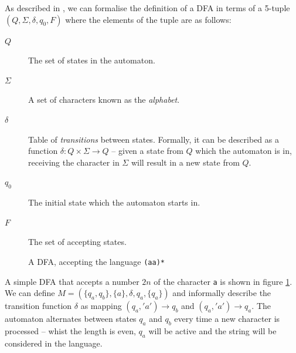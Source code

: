 \documentclass[a4paper,openany]{book}
\begin{document}
As described in \citet[p.~35]{sipser2012introduction}, we can formalise the definition of a DFA in terms of a 5-tuple $(Q, \Sigma, \delta, q_0, F)$ where the elements of the tuple are as follows:

\begin{description}
	\item[$Q$] The set of states in the automaton.
	\item[$\Sigma$] A set of characters known as the \emph{alphabet}.
	\item[$\delta$] Table of \emph{transitions} between states. Formally, it can be described as a function $\delta : Q \times \Sigma \rightarrow Q$ -- given a state from $Q$ which the automaton is in, receiving the character in $\Sigma$ will result in a new state from $Q$.
	\item[$q_0$] The initial state which the automaton starts in.
	\item[$F$] The set of accepting states.
\end{description}
	
\begin{figure}[H]
\begin{MyMdframed}
\vspace{0.5em}


\caption{\label{figure:dfa:1} A DFA, accepting the language \texttt{(aa)*}}
\vspace{0.5em}
\captionsetup{style=default}


\vspace{0.5em}

\end{MyMdframed}

\end{figure}

A simple DFA that accepts a number $2n$ of the character \texttt{a} is shown in figure \ref{figure:dfa:1}. We can define $M = (\{q_a,q_b\}, \{a\}, \delta, q_a, \{q_a\})$ and informally describe the transition function $\delta$ as mapping $(q_a, 'a') \rightarrow q_b$ and $(q_a, 'a') \rightarrow q_a$. The automaton alternates between states $q_a$ and $q_b$ every time a new character is processed -- whist the length is even, $q_a$ will be active and the string will be considered in the language.
\end{document}

